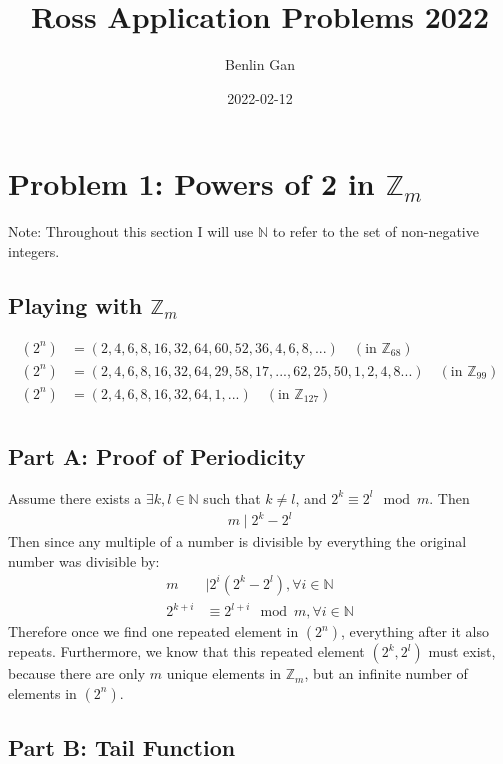 \documentclass{article}
\title{Ross Application Problems 2022}
\date{2022-02-12}
\author{Benlin Gan}
\begin{document}
  \maketitle
  \newpage
  \section{Problem 1: Powers of 2 in $\mathbb{Z}_m$}
  Note: Throughout this section I will use $\mathbb{N}$ to refer to the set of non-negative integers.
  \subsection{Playing with $\mathbb{Z}_m$}
  \begin{align*}
    (2^n) &= (2, 4, 6, 8, 16, 32, 64, 60, 52, 36, 4, 6, 8, ...)   \hspace{1em}  (\textrm{in } \mathbb{Z}_{68})\\ 
    (2^n) &= (2, 4, 6, 8, 16, 32, 64, 29, 58, 17, ..., 62, 25, 50, 1, 2, 4, 8 ...) \hspace{1em}     (\textrm{in } \mathbb{Z}_{99})\\
    (2^n) &= (2, 4, 6, 8, 16, 32, 64, 1, ...) \hspace{1em}     (\textrm{in } \mathbb{Z}_{127})\\
  \end{align*}
  \subsection{Part A: Proof of Periodicity}
  Assume there exists a $\exists k, l \in \mathbb{N}$ such that $k \neq l$, and $2^k \equiv 2^l \mod m$. Then
  \begin{align}
    m \mid 2^k - 2^l 
  \end{align}
  Then since any multiple of a number is divisible by everything the original number was divisible by:
  \begin{align}
    m &\mid 2^i(2^k-2^l), \forall i \in \mathbb{N}\\
    2^{k+i} &\equiv 2^{l+i} \mod m, \forall i \in \mathbb{N}
  \end{align}
  Therefore once we find one repeated element in $(2^n)$, everything after it also repeats. Furthermore, we know that this repeated element $(2^k, 2^l)$ must exist, because there are only $m$ unique elements in $\mathbb{Z}_m$, but an infinite number of elements in $(2^n)$.
  \subsection{Part B: Tail Function}
\end{document}
